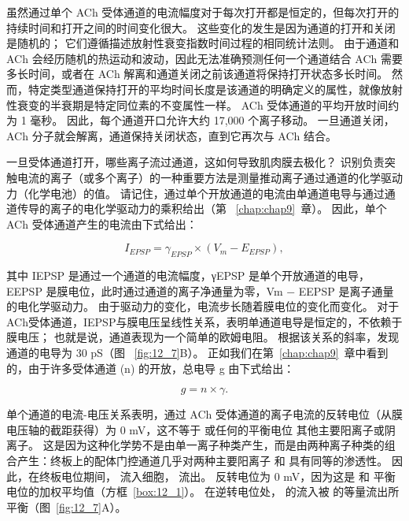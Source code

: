 虽然通过单个 ACh 受体通道的电流幅度对于每次打开都是恒定的，但每次打开的持续时间和打开之间的时间变化很大。
这些变化的发生是因为通道的打开和关闭是随机的；
它们遵循描述放射性衰变指数时间过程的相同统计法则。 
由于通道和 ACh 会经历随机的热运动和波动，因此无法准确预测任何一个通道结合 ACh 需要多长时间，或者在 ACh 解离和通道关闭之前该通道将保持打开状态多长时间。
然而，特定类型通道保持打开的平均时间长度是该通道的明确定义的属性，就像放射性衰变的半衰期是特定同位素的不变属性一样。
ACh 受体通道的平均开放时间约为 1 毫秒。
因此，每个通道开口允许大约 17,000 个离子移动。
一旦通道关闭，ACh 分子就会解离，通道保持关闭状态，直到它再次与 ACh 结合。


一旦受体通道打开，哪些离子流过通道，这如何导致肌肉膜去极化？
识别负责突触电流的离子（或多个离子）的一种重要方法是测量推动离子通过通道的化学驱动力（化学电池）的值。
请记住，通过单个开放通道的电流由单通道电导与通过通道传导的离子的电化学驱动力的乘积给出（第 ~\ref{chap:chap9}~章）。 
因此，单个 ACh 受体通道产生的电流由下式给出：


\begin{equation}
	I_{EPSP} = \gamma_{EPSP}\times (V_m - E_{EPSP}),
\end{equation}


其中 IEPSP 是通过一个通道的电流幅度，γEPSP 是单个开放通道的电导，EEPSP 是膜电位，此时通过通道的离子净通量为零，Vm − EEPSP 是离子通量的电化学驱动力。
由于驱动力的变化，电流步长随着膜电位的变化而变化。 
对于ACh受体通道，IEPSP与膜电压呈线性关系，表明单通道电导是恒定的，不依赖于膜电压；
也就是说，通道表现为一个简单的欧姆电阻。
根据该关系的斜率，发现通道的电导为 30 pS（图 ~\ref{fig:12_7}B）。
正如我们在第~\ref{chap:chap9}~章中看到的，由于许多受体通道 (n) 的开放，总电导 g 由下式给出：


\begin{equation}
	g = n \times \gamma.
\end{equation}


单个通道的电流-电压关系表明，通过 ACh 受体通道的离子电流的反转电位（从膜电压轴的截距获得）为 0 mV，这不等于  或任何的平衡电位 其他主要阳离子或阴离子。
这是因为这种化学势不是由单一离子种类产生，而是由两种离子种类的组合产生：终板上的配体门控通道几乎对两种主要阳离子  和  具有同等的渗透性。
因此，在终板电位期间， 流入细胞， 流出。
反转电位为 0 mV，因为这是  和  平衡电位的加权平均值（方框~\ref{box:12_1}）。
在逆转电位处， 的流入被  的等量流出所平衡（图~\ref{fig:12_7}A）。


